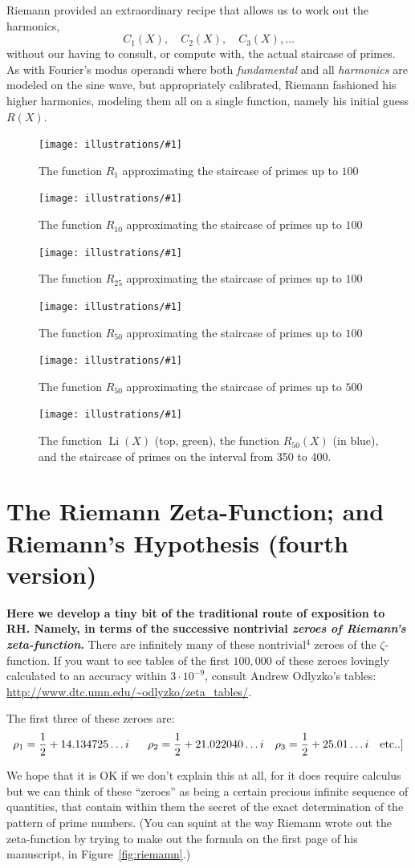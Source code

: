 \documentclass[11pt]{article}
\DeclareMathOperator{\Li}{Li}
\newcommand{\ill}[3]{ 
   \begin{figure}[H]
   \begin{center}
   \texttt{[image: illustrations/\#1]}
   \caption{#3}
   \end{center}
    \end{figure}
}
\theoremstyle{plain}
\theoremstyle{definition}
\numberwithin{equation}{section}
\numberwithin{figure}{section}
\numberwithin{table}{section}
\begin{document}
Riemann provided an extraordinary recipe that allows us to work
out the harmonics, $$C_1(X),\quad C_2(X),\quad C_3(X),\dots$$ without our having
to consult, or compute with, the actual staircase of primes. As with
Fourier's modus operandi where both {\em fundamental} and all {\em
  harmonics} are modeled on the sine wave, but appropriately
calibrated, Riemann fashioned his higher harmonics, modeling them all
on a single function, namely his initial guess $R(X)$.
 
  
\ill{Rk_1_2_100}{.9}{The function $R_{1}$ approximating the staircase of primes up to $100$}

\ill{Rk_10_2_100}{.9}{The function $R_{10}$ approximating the staircase of primes up to $100$}

\ill{Rk_25_2_100}{.9}{The function $R_{25}$ approximating the staircase of primes up to $100$}

\ill{Rk_50_2_100}{.9}{The function $R_{50}$ approximating the staircase of primes up to $100$}


\ill{Rk_50_2_500}{.9}{The function $R_{50}$ approximating the staircase of primes up to $500$}

\ill{Rk_50_350_400}{.9}{The function $\Li(X)$ (top, green), the function $R_{50}(X)$ (in blue), and the staircase of primes on the interval from 350 to 400.}


\section{The Riemann Zeta-Function; and Riemann's Hypothesis (fourth version)}

{\bf Here we develop a tiny bit of the traditional route of exposition
  to RH. Namely, in terms of the successive nontrivial {\em zeroes of
    Riemann's zeta-function}.} There are infinitely many of these
nontrivial$^4$ zeroes of the $ \zeta$-function. If you want to see
tables of the first $100,\!000$ of these zeroes lovingly calculated to
an accuracy within $3 \cdot 10^{-9}$, consult Andrew Odlyzko's tables:
\url{http://www.dtc.umn.edu/~odlyzko/zeta\_tables/}. 

The first three of these zeroes are:
  $$\rho_1={1\over 2} + 14.134725\dots i\ \ \ \ \  \rho_2={1\over 2} + 21.022040\dots i\ \ \ \rho_3={1\over 2} + 25.01\dots i\ \ 
\ {\rm etc.}.]$$ 
\bigskip


We hope that it is OK if we don't explain this at all, for it does
require calculus but we can think of these ``zeroes'' as being a
certain precious infinite sequence of quantities, that contain within
them the secret of the exact determination of the pattern of prime
numbers. (You can squint at the way Riemann wrote out the
zeta-function by trying to make out the formula on the first page of
his manuscript, in Figure~\ref{fig:riemamn}.)
    
\end{document}
